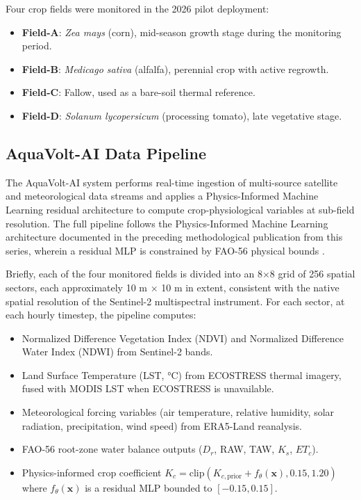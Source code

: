 \documentclass[review,12pt]{elsarticle}
\begin{document}
Four crop fields were monitored in the 2026 pilot deployment:
\begin{itemize}
  \item \textbf{Field-A}: \textit{Zea mays} (corn), mid-season growth stage during the monitoring period.
  \item \textbf{Field-B}: \textit{Medicago sativa} (alfalfa), perennial crop with active regrowth.
  \item \textbf{Field-C}: Fallow, used as a bare-soil thermal reference.
  \item \textbf{Field-D}: \textit{Solanum lycopersicum} (processing tomato), late vegetative stage.
\end{itemize}

\subsection{AquaVolt-AI Data Pipeline}
\label{subsec:aquavolt}

The AquaVolt-AI system performs real-time ingestion of multi-source satellite and meteorological data streams and applies a Physics-Informed Machine Learning residual architecture to compute crop-physiological variables at sub-field resolution. The full pipeline follows the Physics-Informed Machine Learning architecture documented in the preceding methodological publication from this series, wherein a residual MLP is constrained by FAO-56 physical bounds \citep{shen2023deephydrology, zhu2024piml}.

Briefly, each of the four monitored fields is divided into an 8$\times$8 grid of 256 spatial sectors, each approximately 10 m $\times$ 10 m in extent, consistent with the native spatial resolution of the Sentinel-2 multispectral instrument. For each sector, at each hourly timestep, the pipeline computes:

\begin{itemize}
  \item Normalized Difference Vegetation Index (NDVI) and Normalized Difference Water Index (NDWI) from Sentinel-2 bands.
  \item Land Surface Temperature (LST, °C) from ECOSTRESS thermal imagery, fused with MODIS LST when ECOSTRESS is unavailable.
  \item Meteorological forcing variables (air temperature, relative humidity, solar radiation, precipitation, wind speed) from ERA5-Land reanalysis.
  \item FAO-56 root-zone water balance outputs ($D_r$, RAW, TAW, $K_s$, $ET_c$).
  \item Physics-informed crop coefficient $K_c = \text{clip}(K_{c,\text{prior}} + f_\theta(\mathbf{x}), 0.15, 1.20)$ where $f_\theta(\mathbf{x})$ is a residual MLP bounded to $[-0.15, 0.15]$.
\end{itemize}
\end{document}
